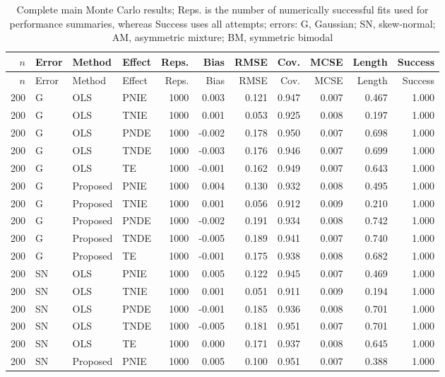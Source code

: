 \begingroup
\footnotesize
\setlength{\tabcolsep}{2.1pt}
\begin{longtable}{rlllrrrrrrr}
\caption{Complete main Monte Carlo results; Reps. is the number of numerically successful fits used for performance summaries, whereas Success uses all attempts; errors: G, Gaussian; SN, skew-normal; AM, asymmetric mixture; BM, symmetric bimodal}\label{tab:main_simulation_full}\\
\toprule
$n$ & Error & Method & Effect & Reps. & Bias & RMSE & Cov. & MCSE & Length & Success \\
\midrule
\endfirsthead
\toprule
$n$ & Error & Method & Effect & Reps. & Bias & RMSE & Cov. & MCSE & Length & Success \\
\midrule
\endhead
200 & G & OLS & PNIE & 1000 & 0.003 & 0.121 & 0.947 & 0.007 & 0.467 & 1.000 \\
200 & G & OLS & TNIE & 1000 & 0.001 & 0.053 & 0.925 & 0.008 & 0.197 & 1.000 \\
200 & G & OLS & PNDE & 1000 & -0.002 & 0.178 & 0.950 & 0.007 & 0.698 & 1.000 \\
200 & G & OLS & TNDE & 1000 & -0.003 & 0.176 & 0.946 & 0.007 & 0.699 & 1.000 \\
200 & G & OLS & TE & 1000 & -0.001 & 0.162 & 0.949 & 0.007 & 0.643 & 1.000 \\
200 & G & Proposed & PNIE & 1000 & 0.004 & 0.130 & 0.932 & 0.008 & 0.495 & 1.000 \\
200 & G & Proposed & TNIE & 1000 & 0.001 & 0.056 & 0.912 & 0.009 & 0.210 & 1.000 \\
200 & G & Proposed & PNDE & 1000 & -0.002 & 0.191 & 0.934 & 0.008 & 0.742 & 1.000 \\
200 & G & Proposed & TNDE & 1000 & -0.005 & 0.189 & 0.941 & 0.007 & 0.740 & 1.000 \\
200 & G & Proposed & TE & 1000 & -0.001 & 0.175 & 0.938 & 0.008 & 0.682 & 1.000 \\
200 & SN & OLS & PNIE & 1000 & 0.005 & 0.122 & 0.945 & 0.007 & 0.469 & 1.000 \\
200 & SN & OLS & TNIE & 1000 & 0.001 & 0.051 & 0.911 & 0.009 & 0.194 & 1.000 \\
200 & SN & OLS & PNDE & 1000 & -0.001 & 0.185 & 0.936 & 0.008 & 0.701 & 1.000 \\
200 & SN & OLS & TNDE & 1000 & -0.005 & 0.181 & 0.951 & 0.007 & 0.701 & 1.000 \\
200 & SN & OLS & TE & 1000 & 0.000 & 0.171 & 0.937 & 0.008 & 0.645 & 1.000 \\
200 & SN & Proposed & PNIE & 1000 & 0.005 & 0.100 & 0.951 & 0.007 & 0.388 & 1.000 \\

\end{longtable}
